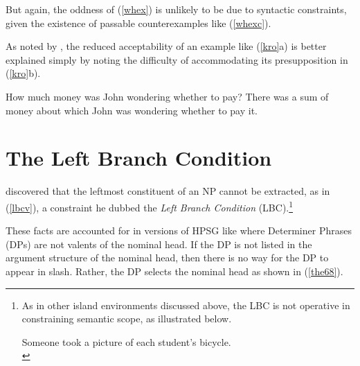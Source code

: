 \documentclass[output=paper
 	        ,biblatex
                ,babelshorthands
                ,newtxmath
                ,draftmode
                ,colorlinks, citecolor=brown
]{langscibook}
\begin{document}
\noindent
But again, the oddness of (\ref{whex})  is unlikely to be due to syntactic constraints,
given the existence of passable counterexamples like (\ref{whexc}).

\eal \label{whexc}
\zl

As noted by \citet{kroch89}, the reduced acceptability of an example like (\ref{kro}a) is better explained simply
by noting the difficulty of accommodating its presupposition in (\ref{kro}b).


\eal \label{kro}
\ex How much money was John wondering whether to pay?
\ex There was a sum of money about which John was wondering whether
to pay it.
\zl


\section{The Left Branch Condition}

\citet{Ross67} discovered that the leftmost constituent of an NP cannot be extracted, 
as in  (\ref{lbcv}), a constraint he dubbed the \emph{Left Branch Condition} (LBC).\footnote{As in other island environments discussed above, the LBC is not operative in constraining semantic scope, as illustrated below.

\ea
Someone took a picture of each student's bicycle.\\
\citep[303]{MRS}
\zlast}
 
 
\eal \label{lbcv}
 

\zl


\noindent
These facts are accounted for in versions of HPSG like \citet{cxsag07} where Determiner Phrases (DPs) are not valents of the nominal head. If the DP is not listed in the argument structure of the nominal head, then there is no way for the DP to appear in {\sc slash}.  Rather, the DP selects the nominal head as
shown in (\ref{the68}).
\end{document}
